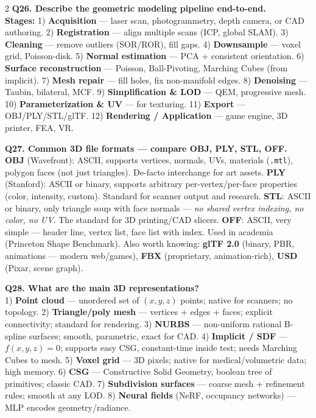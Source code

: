 \begin{paracol}{2}
\textbf{Q26. Describe the geometric modeling pipeline end-to-end.}\\
\textbf{Stages:} 1) \textbf{Acquisition} — laser scan, photogrammetry, depth camera, or CAD authoring. 2) \textbf{Registration} — align multiple scans (ICP, global SLAM). 3) \textbf{Cleaning} — remove outliers (SOR/ROR), fill gaps. 4) \textbf{Downsample} — voxel grid, Poisson-disk. 5) \textbf{Normal estimation} — PCA + consistent orientation. 6) \textbf{Surface reconstruction} — Poisson, Ball-Pivoting, Marching Cubes (from implicit). 7) \textbf{Mesh repair} — fill holes, fix non-manifold edges. 8) \textbf{Denoising} — Taubin, bilateral, MCF. 9) \textbf{Simplification \& LOD} — QEM, progressive mesh. 10) \textbf{Parameterization \& UV} — for texturing. 11) \textbf{Export} — OBJ/PLY/STL/glTF. 12) \textbf{Rendering / Application} — game engine, 3D printer, FEA, VR.

\textbf{Q27. Common 3D file formats — compare OBJ, PLY, STL, OFF.}\\
\textbf{OBJ} (Wavefront): ASCII, supports vertices, normals, UVs, materials (\verb|.mtl|), polygon faces (not just triangles). De-facto interchange for art assets. \textbf{PLY} (Stanford): ASCII or binary, supports arbitrary per-vertex/per-face properties (color, intensity, custom). Standard for scanner output and research. \textbf{STL}: ASCII or binary, only triangle soup with face normals — \textit{no shared vertex indexing, no color, no UV}. The standard for 3D printing/CAD slicers. \textbf{OFF}: ASCII, very simple — header line, vertex list, face list with index. Used in academia (Princeton Shape Benchmark). Also worth knowing: \textbf{glTF 2.0} (binary, PBR, animations — modern web/games), \textbf{FBX} (proprietary, animation-rich), \textbf{USD} (Pixar, scene graph).

\textbf{Q28. What are the main 3D representations?}\\
1) \textbf{Point cloud} — unordered set of $(x,y,z)$ points; native for scanners; no topology. 2) \textbf{Triangle/poly mesh} — vertices + edges + faces; explicit connectivity; standard for rendering. 3) \textbf{NURBS} — non-uniform rational B-spline surfaces; smooth, parametric, exact for CAD. 4) \textbf{Implicit / SDF} — $f(x,y,z)=0$; supports easy CSG, constant-time inside test; needs Marching Cubes to mesh. 5) \textbf{Voxel grid} — 3D pixels; native for medical/volumetric data; high memory. 6) \textbf{CSG} — Constructive Solid Geometry, boolean tree of primitives; classic CAD. 7) \textbf{Subdivision surfaces} — coarse mesh + refinement rules; smooth at any LOD. 8) \textbf{Neural fields} (NeRF, occupancy networks) — MLP encodes geometry/radiance.


\end{paracol}
